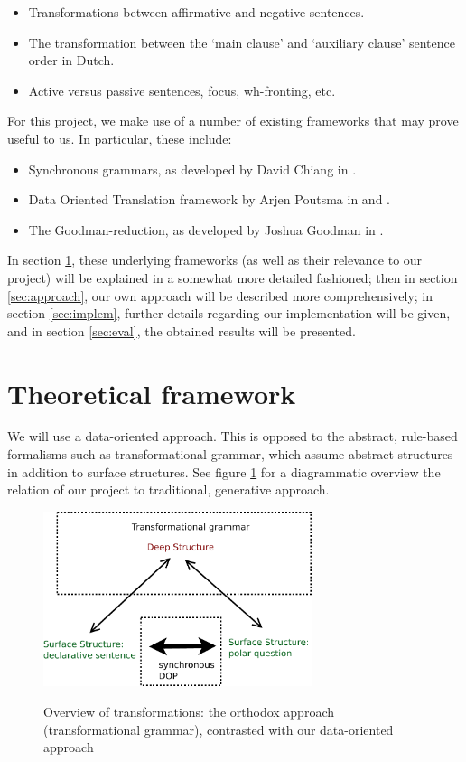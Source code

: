 \documentclass[a4paper]{article}
\theoremstyle{definition}
\begin{document}
\begin{itemize}
\item Transformations between affirmative and negative sentences.
\item The transformation between the `main clause' and `auxiliary clause'
	sentence order in Dutch.
\item Active versus passive sentences, focus, wh-fronting, etc.
\end{itemize}

For this project, we make use of a number of existing frameworks that may prove
useful to us. In particular, these include:

\begin{itemize}
\item Synchronous grammars, as developed by David Chiang in \cite{Ch}.
\item Data Oriented Translation framework by Arjen Poutsma in \cite{Po} and
	\cite{Po2}.
\item The Goodman-reduction, as developed by Joshua Goodman in \cite{Go}.
\end{itemize}

In section \ref{sec:theor}, these underlying frameworks (as well as their
relevance to our project) will be explained in a somewhat more detailed
fashioned; then in section \ref{sec:approach}, our own approach will be
described more comprehensively; in section \ref{sec:implem}, further details
regarding our implementation will be given, and in section \ref{sec:eval}, the
obtained results will be presented.

\section{Theoretical framework}
\label{sec:theor}

We will use a data-oriented approach. This is opposed to the abstract, rule-based
formalisms such as transformational grammar, which assume abstract structures in
addition to surface structures. See figure \ref{synchdop} for a diagrammatic overview
the relation of our project to traditional, generative approach.

\begin{figure}
\centering\includegraphics[width=0.7\textwidth]{synchdop-crop}
\label{synchdop}
\caption{Overview of transformations: the orthodox approach (transformational grammar),
	contrasted with our data-oriented approach}
\end{figure}
\end{document}
